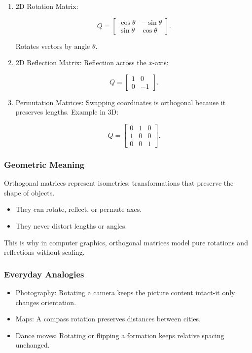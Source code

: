 \documentclass[
  letterpaper,
  DIV=11,
  numbers=noendperiod]{scrreprt}
\providecommand{\tightlist}{%
  \setlength{\itemsep}{0pt}\setlength{\parskip}{0pt}}
\begin{document}
\begin{enumerate}
\def\labelenumi{\arabic{enumi}.}
\item
  2D Rotation Matrix:

  \[
  Q = \begin{bmatrix} \cos \theta & -\sin \theta \\ \sin \theta & \cos \theta \end{bmatrix}.
  \]

  Rotates vectors by angle \(\theta\).
\item
  2D Reflection Matrix: Reflection across the \(x\)-axis:

  \[
  Q = \begin{bmatrix} 1 & 0 \\ 0 & -1 \end{bmatrix}.
  \]
\item
  Permutation Matrices: Swapping coordinates is orthogonal because it
  preserves lengths. Example in 3D:

  \[
  Q = \begin{bmatrix}0 & 1 & 0 \\ 1 & 0 & 0 \\ 0 & 0 & 1\end{bmatrix}.
  \]
\end{enumerate}

\subsubsection{Geometric Meaning}\label{geometric-meaning-22}

Orthogonal matrices represent isometries: transformations that preserve
the shape of objects.

\begin{itemize}
\tightlist
\item
  They can rotate, reflect, or permute axes.
\item
  They never distort lengths or angles.
\end{itemize}

This is why in computer graphics, orthogonal matrices model pure
rotations and reflections without scaling.

\subsubsection{Everyday Analogies}\label{everyday-analogies-74}

\begin{itemize}
\tightlist
\item
  Photography: Rotating a camera keeps the picture content intact-it
  only changes orientation.
\item
  Maps: A compass rotation preserves distances between cities.
\item
  Dance moves: Rotating or flipping a formation keeps relative spacing
  unchanged.
\end{itemize}
\end{document}
